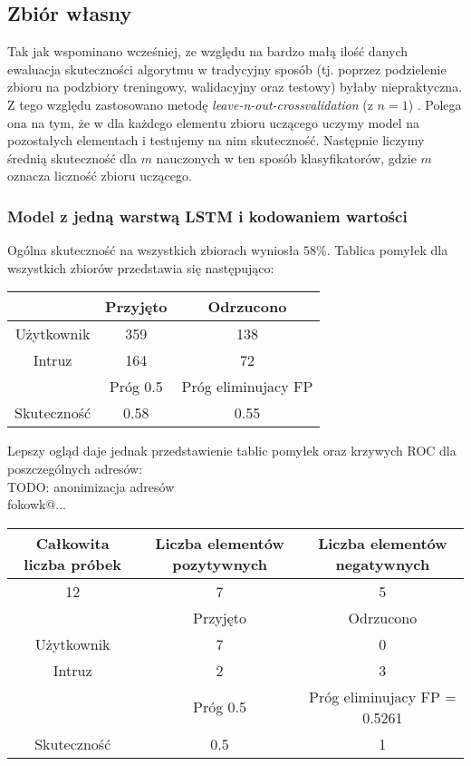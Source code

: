 	\subsection{Zbiór własny}
	Tak jak wspominano wcześniej, ze względu na bardzo małą ilość danych ewaluacja skuteczności algorytmu w tradycyjny sposób (tj. poprzez podzielenie zbioru na podzbiory treningowy, walidacyjny oraz testowy) byłaby niepraktyczna. Z tego względu zastosowano metodę \textit{leave-n-out-crossvalidation} (z $n=1$) \cite{1-X-VAL}. Polega ona na tym, że w dla każdego elementu zbioru uczącego uczymy model na pozostałych elementach i testujemy na nim skuteczność. Następnie liczymy średnią skuteczność dla $m$ nauczonych w ten sposób klasyfikatorów, gdzie $m$ oznacza liczność zbioru uczącego.
		\subsubsection{Model z jedną warstwą LSTM i kodowaniem wartości}
		Ogólna skuteczność na wszystkich zbiorach wyniosła $58\%$. Tablica pomyłek dla wszystkich zbiorów przedstawia się następująco: \\
		\begin{tabular}{|c|c|c|}
		\hline
		& Przyjęto & Odrzucono \\ \hline
		Użytkownik & 359 & 138 \\ \hline
		Intruz & 164 & 72 \\ \hline
		& Próg 0.5 & Próg eliminujacy FP \\ \hline
		Skuteczność & 0.58 & 0.55 \\ \hline
		\end{tabular}

		Lepszy ogląd daje jednak przedstawienie tablic pomyłek oraz krzywych ROC dla poszczególnych adresów: \\
		TODO: anonimizacja adresów \\
		fokowk@... \\
		\begin{tabular}{|c|c|c|}
		\hline
		Całkowita liczba próbek & Liczba elementów pozytywnych & Liczba elementów negatywnych \\ \hline
		12 & 7 & 5 \\ \hline
		& Przyjęto & Odrzucono \\ \hline
		Użytkownik & 7 & 0 \\ \hline
		Intruz & 2 & 3 \\ \hline
		& Próg 0.5 & Próg eliminujacy FP = 0.5261 \\ \hline
		Skuteczność & 0.5 & 1 \\ \hline
		\end{tabular}


